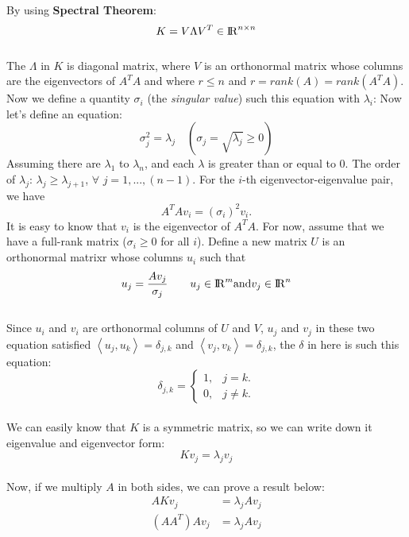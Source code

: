 \documentclass{article}
\begin{document}
By using \textbf{Spectral Theorem}: 
\begin{equation}
	K = V \Lambda V^T \in {\rm I\!R}^{n \times n}
\end{equation}
\\
The $\Lambda$ in $K$ is diagonal matrix, where $V$ is an orthonormal matrix whose columns are the eigenvectors of $A^TA$ and where $r \leq n$ and $r = rank(A) = rank(A^TA) $. Now we define a quantity $\sigma_i$ (the \textit{singular value}) such this equation with $\lambda_i$:
Now let's define an equation:
\begin{equation}
	\sigma_j^2 = \lambda_j     \quad   (\sigma_j = \sqrt{\lambda_j} \geq 0)
\end{equation}
 Assuming there are $\lambda_1$ to $\lambda_n$, and each $\lambda$ is greater than or equal to $0$. The order of $\lambda_j$: $\lambda_j \geq \lambda_{j+1}$, 
$\forall$
$j = 1, ... ,(n-1)$.
For the $i$-th eigenvector-eigenvalue pair, we have
\[A^TAv_{i} = (\sigma_i)^2v_i.\]
It is easy to know that  $v_i$ is the eigenvector of $A^TA$.
For now, assume that we have a full-rank matrix ($\sigma_i \geq 0$ for all $i$). Define a new matrix $U$ is an orthonormal matrixr whose columns $u_i$ such that
\begin{equation}
	u_j = \frac{A v_j}{\sigma_j} \qquad u_j \in {\rm I\!R}^{m} \mbox{and}  v_j \in {\rm I\!R}^{n}
\end{equation}
\\
Since $u_i$ and $v_i$ are orthonormal columns of $U$ and $V$,
$u_j$ and $v_j$ in these two equation satisfied
 $\left\langle u_j, u_k \right\rangle = \delta_{j,k}$ 
 and 
 $\left\langle v_j, v_k \right\rangle = \delta_{j,k}$, 
 the $\delta$ in here is such this equation:
\begin{equation}
		\delta_{j,k}=\left\{
		\begin{array}{ll}
			1, & \mbox{$j=k$}.\\
			0, & \mbox{$j \neq k$}.
		\end{array}
		\right.
\end{equation}
\\
We can easily know that $K$ is a symmetric matrix, so we can write down it eigenvalue and eigenvector form:
\begin{equation}
	Kv_j = \lambda_j v_j
\end{equation}  
\\
Now, if we multiply $A$ in both sides, we can prove a result below:
\begin{align*}
	AKv_j  &= \lambda_j A v_j \\
	(AA^T)Av_j  &= \lambda_j A v_j \\
\end{align*}
\end{document}
